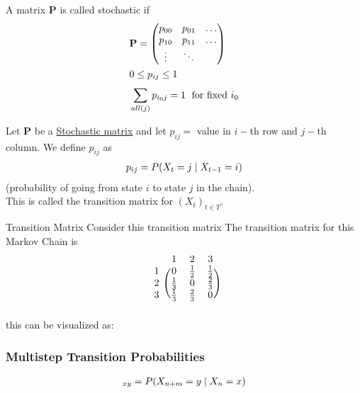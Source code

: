 \documentclass[12pt,a4paper]{article}
\begin{document}
\begin{defn}
\label{stocmat}

A matrix $\mathbf{P}$ is called stochastic if
\begin{align*}
&\mathbf{P} = \mqty(
p_{00} & p_{01} & \ldots \\
p_{10} & p_{11} & \ldots \\
\vdots  & \ddots &
)\\
&0\leq p_{ij} \leq 1\\
&\nsum{all(j)}{} p_{i_0j} = 1 \; \text{ for fixed $i_0$}
\end{align*}
\end{defn}
\begin{defn}
Let $\mathbf{P}$ be a \hyperref[stocmat]{Stochastic matrix} and let $p_{ij} = $ value in $i-$th row and $j-$th column.
We define $p_{ij}$ as
\begin{align*}
&p_{ij} = P(X_{t} = j \;\vert\; X_{t-1} = i)\\
\end{align*}
(probability of going from state $i$ to state $j$ in the chain). \\
This is called the transition matrix for $(X_t)_{t \in T}$.
\end{defn}
\newpage
\begin{example}{Transition Matrix}
Consider this transition matrix 
The transition matrix for this Markov Chain is
\[
\begin{blockarray}{cccc}
& 1 & 2 & 3 \\
\begin{block}{c(ccc)}
1 & 0 & \frac{1}{2} & \frac{1}{2} \\
2 & \frac{1}{3} & 0 & \frac{2}{3} \\
3 & \frac{1}{3} & \frac{2}{3} & 0 \\
\end{block}
\end{blockarray}
\]
this can be visualized as: 
\end{example}
\newpage
\subsubsection{Multistep Transition Probabilities}
\begin{defn}
\begin{align*}
[P(n, n+m)]_{xy} = P(X_{n+m} = y \given X_{n} = x)
\end{align*}
\end{defn}
\end{document}
